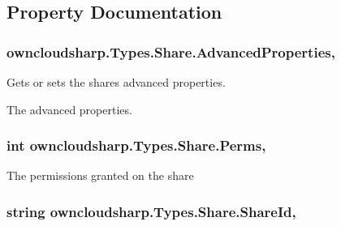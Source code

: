 \subsection{Property Documentation}
\hypertarget{classowncloudsharp_1_1_types_1_1_share_aeaf2ca3c390ed01433320f86deb53ca5}{}
\subsubsection[{Advanced\+Properties}]{ owncloudsharp.\+Types.\+Share.\+Advanced\+Properties\hspace{0.3cm}{\ttfamily [get]}, {\ttfamily [set]}}\label{classowncloudsharp_1_1_types_1_1_share_aeaf2ca3c390ed01433320f86deb53ca5}


Gets or sets the shares advanced properties. 

The advanced properties.\hypertarget{classowncloudsharp_1_1_types_1_1_share_a9d6c9011eaba3aa723444e01969bc9b8}{}
\subsubsection[{Perms}]{\setlength{\rightskip}{0pt plus 5cm}int owncloudsharp.\+Types.\+Share.\+Perms\hspace{0.3cm}{\ttfamily [get]}, {\ttfamily [set]}}\label{classowncloudsharp_1_1_types_1_1_share_a9d6c9011eaba3aa723444e01969bc9b8}


The permissions granted on the share 

\hypertarget{classowncloudsharp_1_1_types_1_1_share_a39b7a60ac0aae1a630516b199e4ecaf3}{}
\subsubsection[{Share\+Id}]{\setlength{\rightskip}{0pt plus 5cm}string owncloudsharp.\+Types.\+Share.\+Share\+Id\hspace{0.3cm}{\ttfamily [get]}, {\ttfamily [set]}}\label{classowncloudsharp_1_1_types_1_1_share_a39b7a60ac0aae1a630516b199e4ecaf3}


